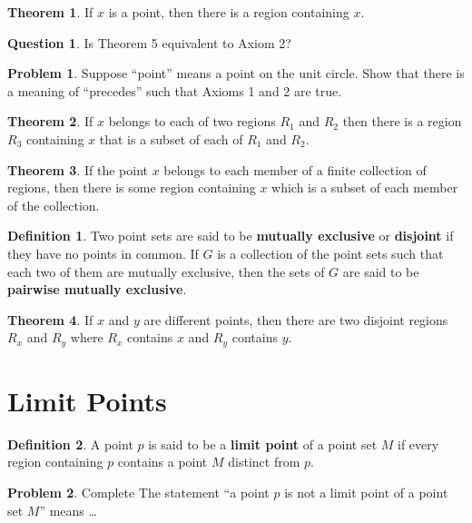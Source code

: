 \documentclass{article}
\theoremstyle{definition}
\newtheorem{definition}{Definition}
\newtheorem{question}{Question}
\newtheorem{theorem}{Theorem}
\theoremstyle{definition}
\newtheorem{problem}{Problem}
\theoremstyle{plain}
\begin{document}
\begin{theorem}
  If $x$ is a point, then there is a region containing $x$.
\end{theorem}

\begin{question}
  Is Theorem 5 equivalent to Axiom 2?
\end{question}

\begin{problem}
  Suppose ``point'' means a point on the unit circle.  Show that there is a
  meaning of ``precedes'' such that Axioms 1 and 2 are true.
\end{problem}

\begin{theorem}
  If $x$ belongs to each of two regions $R_1$ and $R_2$ then there is a region
  $R_3$ containing $x$ that is a subset of each of $R_1$ and $R_2$.
\end{theorem}

\begin{theorem}
  If the point $x$ belongs to each member of a finite collection of regions,
  then there is some region containing $x$ which is a subset of each member of
  the collection.
\end{theorem}

\begin{definition}
  Two point sets are said to be \textbf{mutually exclusive} or
  \textbf{disjoint} if they have no points in common.  If $G$ is a collection
  of the point sets such that each two of them are mutually exclusive, then the
  sets of $G$ are said to be \textbf{pairwise mutually exclusive}.
\end{definition}

\begin{theorem}
  If $x$ and $y$ are different points, then there are two disjoint regions
  $R_x$ and $R_y$ where $R_x$ contains $x$ and $R_y$ contains $y$.
\end{theorem}

\section*{Limit Points}

\begin{definition}
  A point $p$ is said to be a \textbf{limit point} of a point set $M$ if every
  region containing $p$ contains a point $M$ distinct from $p$.
\end{definition}

\begin{problem}
  Complete The statement ``a point $p$ is not a limit point of a point set
  $M$'' means \ldots
\end{problem}
\end{document}
